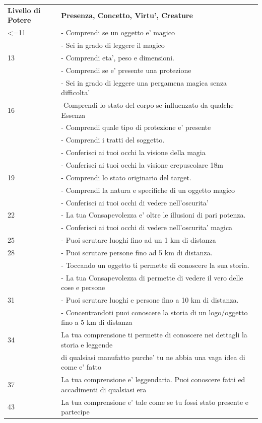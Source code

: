 \documentclass[a4paper,11pt,twoside,openany]{book}
\begin{document}
\begin{tabular}{L{3cm} L{13cm}}
\toprule
\textbf{Livello di Potere} & \textbf{Presenza, Concetto, Virtu', Creature}\tabularnewline
<=11 &- Comprendi se un oggetto e’ magico\\
&- Sei in grado di leggere il magico\\
13& - Comprendi eta’, peso e dimensioni.\\
&- Comprendi se e’ presente una protezione\\
&- Sei in grado di leggere una pergamena magica senza difficolta’\\
16& -Comprendi lo stato del corpo se influenzato da qualche Essenza\\
&- Comprendi quale tipo di protezione e’ presente\\
&- Comprendi i tratti del soggetto.\\
&- Conferisci ai tuoi occhi la visione della magia\\
&- Conferisci ai tuoi occhi la visione crepuscolare 18m\\
19& - Comprendi lo stato originario del target.\\
&- Comprendi la natura e specifiche di un oggetto magico\\
&- Conferisci ai tuoi occhi di vedere nell’oscurita’\\
22& - La tua Consapevolezza e’ oltre le illusioni di pari potenza.\\
&- Conferisci ai tuoi occhi di vedere nell’oscurita’ magica\\
25& - Puoi scrutare luoghi fino ad un 1 km di distanza\\
28& - Puoi scrutare persone fino ad 5 km di distanza.\\
&- Toccando un oggetto ti permette di conoscere la sua storia.\\
&- La tua Consapevolezza di permette di vedere il vero delle cose e persone\\
31& - Puoi scrutare luoghi e persone fino a 10 km di distanza.\\
&- Concentrandoti puoi conoscere la storia di un logo/oggetto fino a 5 km di distanza\\
34& La tua comprensione ti permette di conoscere nei dettagli la storia e
leggende\\
& di qualsiasi manufatto purche’ tu ne abbia una vaga idea di come e’ fatto\\
37& La tua comprensione e’ leggendaria. Puoi conoscere fatti ed accadimenti  di qualsiasi era\\
43& La tua comprensione e’ tale come se tu fossi stato presente e partecipe\\
\end{tabular}
\end{document}
